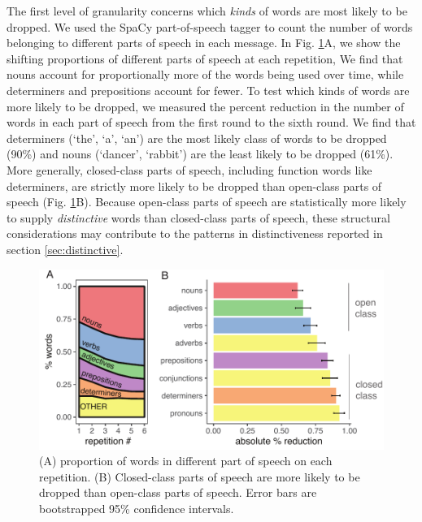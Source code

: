 \documentclass[alpha-refs]{wiley-article}
\begin{document}
The first level of granularity concerns which \emph{kinds} of words are most likely to be dropped. 
We used the SpaCy part-of-speech tagger \citep{spacy2} to count the number of words belonging to different parts of speech in each message.
In Fig. \ref{fig:pos}A, we show the shifting proportions of different parts of speech at each repetition, 
We find that nouns account for proportionally more of the words being used over time, while determiners and prepositions account for fewer.
To test which kinds of words are more likely to be dropped, we measured the percent reduction in the number of words in each part of speech from the first round to the sixth round. 
We find that determiners (`the', `a', `an') are the most likely class of words to be dropped (90\%) and nouns (`dancer', `rabbit') are the least likely to be dropped (61\%).%
More generally, closed-class parts of speech, including function words like determiners, are strictly more likely to be dropped than open-class parts of speech (Fig. \ref{fig:pos}B).
Because open-class parts of speech are statistically more likely to supply \emph{distinctive} words than closed-class parts of speech, these structural considerations may contribute to the patterns in distinctiveness reported in section \ref{sec:distinctive}.


\begin{figure}[t!]
\centering
\includegraphics[scale=.8]{posResults.pdf}
\caption{(A) proportion of words in different part of speech on each repetition. (B) Closed-class parts of speech are more likely to be dropped than open-class parts of speech. Error bars are bootstrapped 95\% confidence intervals.} 
\label{fig:pos}
\end{figure}
\end{document}
